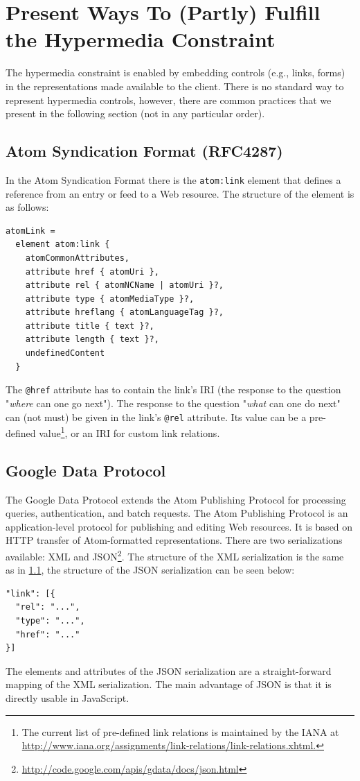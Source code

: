 \documentclass{acm_proc_article-sp}
\begin{document}
\section{Present Ways To (Partly) Fulfill the Hypermedia Constraint}\label{sec:currenthateoas}
The hypermedia constraint is enabled by embedding controls (e.g., links, forms) in the representations made available to the client. There is no standard way to represent hypermedia controls, however, there are common practices that we present in the following section (not in any particular order).

\subsection{Atom Syndication Format (RFC4287)}\label{sec:atom}
In the Atom Syndication Format \cite{Atom:Synd} there is the \texttt{atom:link} element that defines a reference from an entry or feed to a Web resource. The structure of the element is as follows:
\begin{verbatim}
atomLink =
  element atom:link {
    atomCommonAttributes,
    attribute href { atomUri },
    attribute rel { atomNCName | atomUri }?,
    attribute type { atomMediaType }?,
    attribute hreflang { atomLanguageTag }?,
    attribute title { text }?,
    attribute length { text }?,
    undefinedContent
  }
\end{verbatim}
The \texttt{@href} attribute has to contain the link's IRI (the response to the question "\textit{where} can one go next"). The response to the question "\textit{what} can one do next" can (not must) be given in the link's \texttt{@rel} attribute. Its value can be a pre-defined value\footnote{The current list of pre-defined link relations is maintained by the IANA at \url{http://www.iana.org/assignments/link-relations/link-relations.xhtml.}}, or an IRI for custom link relations.

\subsection{Google Data Protocol}\label{sec:gdata}
The Google Data Protocol\cite{Google:Data} extends the Atom Publishing Protocol\cite{Atom:Pub} for processing queries, authentication, and batch requests. The Atom Publishing Protocol is an application-level protocol for publishing and editing Web resources. It is based on HTTP transfer of Atom-formatted representations. There are two serializations available: XML and JSON\footnote{\url{http://code.google.com/apis/gdata/docs/json.html}}. The structure of the XML serialization is the same as in \ref{sec:atom}, the structure of the JSON serialization can be seen below:
\begin{verbatim}
"link": [{
  "rel": "...",
  "type": "...",
  "href": "..."
}]
\end{verbatim}
The elements and attributes of the JSON serialization are a straight-forward mapping of the XML serialization. The main advantage of JSON is that it is directly usable in JavaScript.
\end{document}
